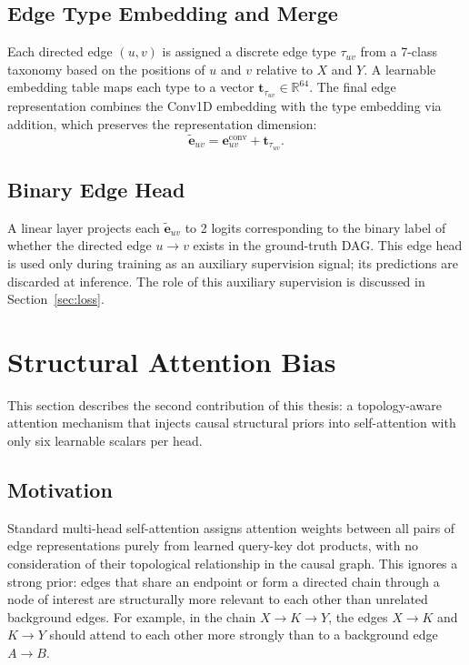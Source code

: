 \subsection{Edge Type Embedding and Merge}

Each directed edge $(u, v)$ is assigned a discrete edge type $\tau_{uv}$ from a 7-class taxonomy based on the positions of $u$ and $v$ relative to $X$ and $Y$. A learnable embedding table maps each type to a vector $\mathbf{t}_{\tau_{uv}} \in \mathbb{R}^{64}$. The final edge representation combines the Conv1D embedding with the type embedding via addition, which preserves the representation dimension:
\begin{equation}
\tilde{\mathbf{e}}_{uv} = \mathbf{e}_{uv}^{\mathrm{conv}} + \mathbf{t}_{\tau_{uv}}.
\label{eq:merge}
\end{equation}

\subsection{Binary Edge Head}

A linear layer projects each $\tilde{\mathbf{e}}_{uv}$ to 2 logits corresponding to the binary label of whether the directed edge $u \to v$ exists in the ground-truth DAG. This edge head is used only during training as an auxiliary supervision signal; its predictions are discarded at inference. The role of this auxiliary supervision is discussed in Section~\ref{sec:loss}.

\section{Structural Attention Bias}
\label{sec:struct_bias}

This section describes the second contribution of this thesis: a topology-aware attention mechanism that injects causal structural priors into self-attention with only six learnable scalars per head.

\subsection{Motivation}

Standard multi-head self-attention assigns attention weights between all pairs of edge representations purely from learned query-key dot products, with no consideration of their topological relationship in the causal graph. This ignores a strong prior: edges that share an endpoint or form a directed chain through a node of interest are structurally more relevant to each other than unrelated background edges. For example, in the chain $X \to K \to Y$, the edges $X \to K$ and $K \to Y$ should attend to each other more strongly than to a background edge $A \to B$.

